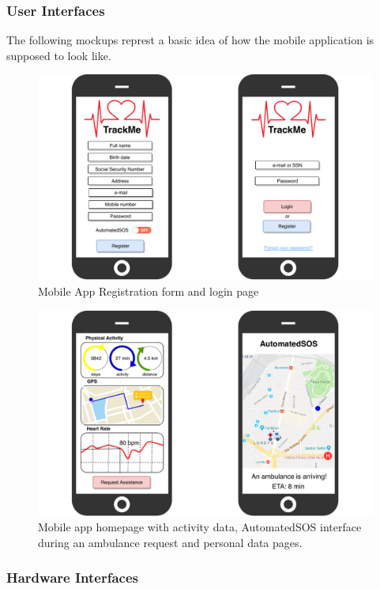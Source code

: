 \documentclass[12pt,a4paper]{article}
\begin{document}
			\subsubsection{User Interfaces}
				The following mockups represt a basic idea of how the mobile application is supposed to look like.\\
				\begin{figure}[h]
					\centering
					\includegraphics[width=1.0\linewidth]{Images/login-registration}
					\caption{Mobile App Registration form and login page}
					\label{fig:login-registration}
				\end{figure}
				\begin{figure}[H]
					\centering
					\includegraphics[width=1.0\linewidth]{Images/pages}
					\caption{Mobile app homepage with activity data, AutomatedSOS interface during an ambulance request and personal data pages.}
					\label{fig:pages}
				\end{figure}
			
			\newpage
			\subsubsection{Hardware Interfaces}
\end{document}
